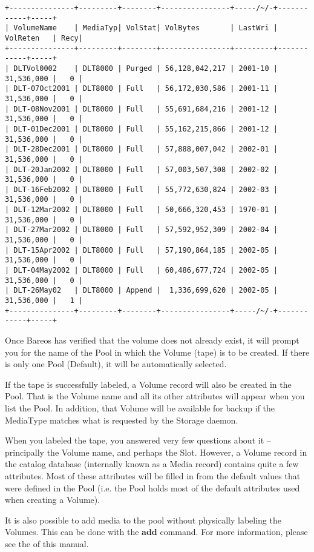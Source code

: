 \footnotesize
\begin{verbatim}
+---------------+---------+--------+----------------+-----/~/-+------------+-----+
| VolumeName    | MediaTyp| VolStat| VolBytes       | LastWri | VolReten   | Recy|
+---------------+---------+--------+----------------+---------+------------+-----+
| DLTVol0002    | DLT8000 | Purged | 56,128,042,217 | 2001-10 | 31,536,000 |   0 |
| DLT-07Oct2001 | DLT8000 | Full   | 56,172,030,586 | 2001-11 | 31,536,000 |   0 |
| DLT-08Nov2001 | DLT8000 | Full   | 55,691,684,216 | 2001-12 | 31,536,000 |   0 |
| DLT-01Dec2001 | DLT8000 | Full   | 55,162,215,866 | 2001-12 | 31,536,000 |   0 |
| DLT-28Dec2001 | DLT8000 | Full   | 57,888,007,042 | 2002-01 | 31,536,000 |   0 |
| DLT-20Jan2002 | DLT8000 | Full   | 57,003,507,308 | 2002-02 | 31,536,000 |   0 |
| DLT-16Feb2002 | DLT8000 | Full   | 55,772,630,824 | 2002-03 | 31,536,000 |   0 |
| DLT-12Mar2002 | DLT8000 | Full   | 50,666,320,453 | 1970-01 | 31,536,000 |   0 |
| DLT-27Mar2002 | DLT8000 | Full   | 57,592,952,309 | 2002-04 | 31,536,000 |   0 |
| DLT-15Apr2002 | DLT8000 | Full   | 57,190,864,185 | 2002-05 | 31,536,000 |   0 |
| DLT-04May2002 | DLT8000 | Full   | 60,486,677,724 | 2002-05 | 31,536,000 |   0 |
| DLT-26May02   | DLT8000 | Append |  1,336,699,620 | 2002-05 | 31,536,000 |   1 |
+---------------+---------+--------+----------------+-----/~/-+------------+-----+
\end{verbatim}
\normalsize

Once Bareos has verified that the volume does not already exist, it will
prompt you for the name of the Pool in which the Volume (tape) is to be
created.  If there is only one Pool (Default), it will be automatically
selected.

If the tape is successfully labeled, a Volume record will also be created in
the Pool. That is the Volume name and all its other attributes will appear
when you list the Pool. In addition, that Volume will be available for backup
if the MediaType matches what is requested by the Storage daemon.

When you labeled the tape, you answered very few questions about it --
principally the Volume name, and perhaps the Slot. However, a Volume record in
the catalog database (internally known as a Media record) contains quite a few
attributes. Most of these attributes will be filled in from the default values
that were defined in the Pool (i.e. the Pool holds most of the default
attributes used when creating a Volume).

It is also possible to add media to the pool without physically labeling the
Volumes. This can be done with the {\bf add} command. For more information,
please see the
 of this manual.
